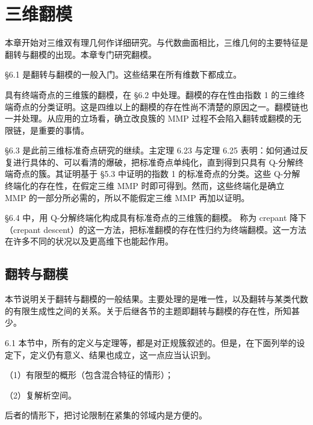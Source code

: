 \chapter{三维翻模}

本章开始对三维双有理几何作详细研究。与代数曲面相比，三维几何的主要特征是翻转与翻模的出现。本章专门研究翻模。

§6.1 是翻转与翻模的一般入门。这些结果在所有维数下都成立。

具有终端奇点的三维簇的翻模，在 §6.2 中处理。翻模的存在性由指数 1 的三维终端奇点的分类证明。这是四维以上的翻模的存在性尚不清楚的原因之一。翻模链也一并处理。从应用的立场看，确立改良簇的 MMP 过程不会陷入翻转或翻模的无限链，是重要的事情。

§6.3 是此前三维标准奇点研究的继续。主定理 6.23 与定理 6.25 表明：如何通过反复进行具体的、可以看清的爆破，把标准奇点单纯化，直到得到只具有 Q-分解终端奇点的簇。其证明基于 §5.3 中证明的指数 1 的标准奇点的分类。这些 Q-分解终端化的存在性，在假定三维 MMP 时即可得到。然而，这些终端化是确立 MMP 的一部分所必需的，所以不能假定三维 MMP 再加以证明。

§6.4 中，用 Q-分解终端化构成具有标准奇点的三维簇的翻模。
称为 crepant 降下（crepant descent）的这一方法，把标准翻模的存在性归约为终端翻模。这一方法在许多不同的状况以及更高维下也能起作用。

\section{翻转与翻模}

本节说明关于翻转与翻模的一般结果。主要处理的是唯一性，以及翻转与某类代数的有限生成性之间的关系。关于后继各节的主题即翻转与翻模的存在性，所知甚少。

\begin{remark}{6.1}
本节中，所有的定义与定理等，都是对正规簇叙述的。但是，在下面列举的设定下，定义仍有意义、结果也成立，这一点应当认识到。

（1）有限型的概形（包含混合特征的情形）；

（2）复解析空间。

后者的情形下，把讨论限制在紧集的邻域内是方便的。
\end{remark}


